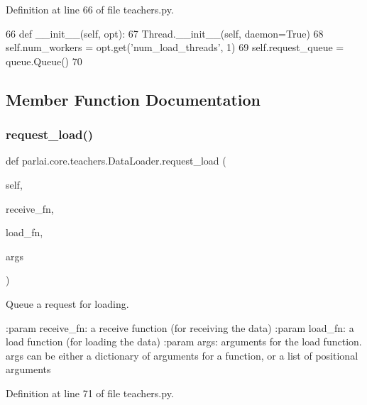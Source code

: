 Definition at line 66 of file teachers.\+py.


\begin{DoxyCode}
66     \textcolor{keyword}{def }\_\_init\_\_(self, opt):
67         Thread.\_\_init\_\_(self, daemon=\textcolor{keyword}{True})
68         self.num\_workers = opt.get(\textcolor{stringliteral}{'num\_load\_threads'}, 1)
69         self.request\_queue = queue.Queue()
70 
\end{DoxyCode}


\subsection{Member Function Documentation}
\mbox{\label{classparlai_1_1core_1_1teachers_1_1DataLoader_a06bfd397f84fd1e2d0d64d64182ae5f5}} 
\subsubsection{\texorpdfstring{request\+\_\+load()}{request\_load()}}
{\footnotesize\ttfamily def parlai.\+core.\+teachers.\+Data\+Loader.\+request\+\_\+load (\begin{DoxyParamCaption}\item[{}]{self,  }\item[{}]{receive\+\_\+fn,  }\item[{}]{load\+\_\+fn,  }\item[{}]{args }\end{DoxyParamCaption})}

\begin{DoxyVerb}Queue a request for loading.

:param receive_fn:
    a receive function (for receiving the data)
:param load_fn:
    a load function (for loading the data)
:param args:
    arguments for the load function. args can be either a dictionary of
    arguments for a function, or a list of positional arguments
\end{DoxyVerb}
 

Definition at line 71 of file teachers.\+py.


